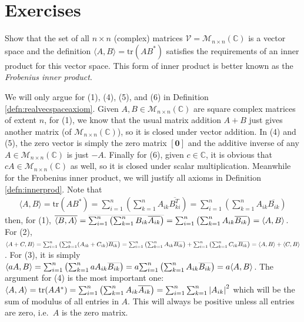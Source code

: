 \section{Exercises}

\begin{Exercise}
Show that the set of all $n \times n$ (complex) matrices $\mathcal{V} = \mathcal{M}_{n \times n}(\mathbb{C})$ is a vector space and the definition $\langle A, B\rangle = \text{tr}(AB^*)$ satisfies the requirements of an inner product for this vector space. This form of inner product is better known as the \textit{Frobenius inner product}.
\end{Exercise}
\begin{Answer}
We will only argue for (1), (4), (5), and (6) in Definition \ref{defn:realvecspaceaxiom}. Given $A, B \in \mathcal{M}_{n \times n}(\mathbb{C})$ are square complex matrices of extent $n$, for (1), we know that the usual matrix addition $A + B$ just gives another matrix (of $\mathcal{M}_{n \times n}(\mathbb{C})$), so it is closed under vector addition. In (4) and (5), the zero vector is simply the zero matrix $[\textbf{0}]$ and the additive inverse of any $A \in \mathcal{M}_{n \times n}(\mathbb{C})$ is just $-A$. Finally for (6), given $c \in \mathbb{C}$, it is obvious that $cA \in \mathcal{M}_{n \times n}(\mathbb{C})$ as well, so it is closed under scalar multiplication. Meanwhile for the Frobenius inner product, we will justify all axioms in Definition \ref{defn:innerprod}. Note that
\begin{align*}
\langle A, B\rangle = \text{tr}(AB^*) = \sum_{i=1}^{n}\left(\sum_{k=1}^{n} A_{ik}\overline{B^T_{ki}}\right) = \sum_{i=1}^{n}\left(\sum_{k=1}^{n} A_{ik}\overline{B_{ik}}\right)
\end{align*}
then, for (1), $\overline{\langle B, A\rangle} = \smash{\overline{\sum_{i=1}^{n}\left(\sum_{k=1}^{n} B_{ik}\overline{A_{ik}}\right)}} = \smash{\sum_{i=1}^{n}\left(\sum_{k=1}^{n} A_{ik}\overline{B_{ik}}\right)} = \langle A, B\rangle$. For (2), $\langle A+C, B\rangle = \smash{\sum_{i=1}^{n}\left(\sum_{k=1}^{n} (A_{ik} + C_{ik})\overline{B_{ik}}\right)} = \smash{\sum_{i=1}^{n}\left(\sum_{k=1}^{n} A_{ik}\overline{B_{ik}}\right)} + \smash{\sum_{i=1}^{n}\left(\sum_{k=1}^{n} C_{ik}\overline{B_{ik}}\right)} = \langle A, B\rangle + \langle C, B\rangle$. For (3), it is simply $\langle aA, B\rangle = \smash{\sum_{i=1}^{n}\left(\sum_{k=1}^{n} aA_{ik}\overline{B_{ik}}\right)} = a\smash{\sum_{i=1}^{n}\left(\sum_{k=1}^{n} A_{ik}\overline{B_{ik}}\right)} = a\langle A,B\rangle$. The argument for (4) is the most important one: $\langle A, A\rangle = \text{tr}(AA^*) = \smash{\sum_{i=1}^{n}\left(\sum_{k=1}^{n} A_{ik}\overline{A_{ik}}\right)} = \sum_{i=1}^{n}\sum_{k=1}^{n} \abs{A_{ik}}^2$ which will be the sum of modulus of all entries in $A$. This will always be positive unless all entries are zero, i.e.\ $A$ is the zero matrix.
\end{Answer}

